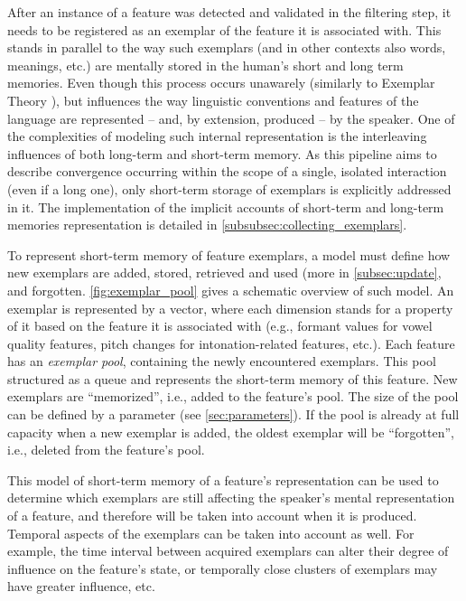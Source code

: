 After an instance of a feature was detected and validated in the filtering step, it needs to be registered as an exemplar of the feature it is associated with.
This stands in parallel to the way such exemplars (and in other contexts also words, meanings, etc.) are mentally stored in the human's short and long term memories.
Even though this process occurs unawarely (similarly to Exemplar Theory
), but influences the way linguistic conventions and features of the language are represented -- and, by extension, produced -- by the speaker.
One of the complexities of modeling such internal representation is the interleaving influences of both long-term and short-term memory.
As this pipeline aims to describe convergence occurring within the scope of a single, isolated interaction (even if a long one), only short-term storage of exemplars is explicitly addressed in it.
The implementation of the implicit accounts of short-term and long-term memories representation is detailed in \cref{subsubsec:collecting_exemplars}.

To represent short-term memory of feature exemplars, a model must define how new exemplars are added, stored, retrieved and used (more in \cref{subsec:update}, and forgotten.
\cref{fig:exemplar_pool} gives a schematic overview of such model.
An exemplar is represented by a vector, where each dimension stands for a property of it based on the feature it is associated with (e.g., formant values for vowel quality features, pitch changes for intonation-related features, etc.).
Each feature has an \emph{exemplar pool}, containing the newly encountered exemplars.
This pool structured as a queue and represents the short-term memory of this feature.
New exemplars are \enquote{memorized}, i.e., added to the feature's pool.
The size of the pool can be defined by a parameter (see \cref{sec:parameters}).
If the pool is already at full capacity when a new exemplar is added, the oldest exemplar will be \enquote{forgotten}, i.e., deleted from the feature's pool.

This model of short-term memory of a feature's representation can be used to determine which exemplars are still affecting the speaker's mental representation of a feature, and therefore will be taken into account when it is produced.
Temporal aspects of the exemplars can be taken into account as well.
For example, the time interval between acquired exemplars can alter their degree of influence on the feature's state, or temporally close clusters of exemplars may have greater influence, etc.

